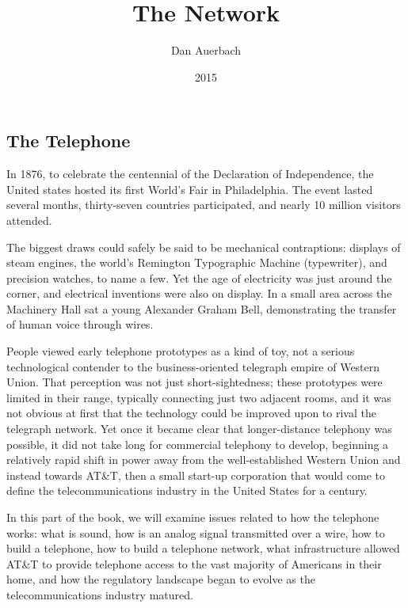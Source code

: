 \documentclass[UTF8]{book}
\begin{document}
\begin{CJK}{UTF8}{gbsn}

\title{The Network}
\author{Dan Auerbach}
\date{2015}
\maketitle

\part{The Telephone}

In 1876, to celebrate the centennial of the Declaration of Independence, the United states hosted its first World's Fair in Philadelphia. The event lasted several months, thirty-seven countries participated, and nearly 10 million visitors attended.

The biggest draws could safely be said to be mechanical contraptions: displays of steam engines, the world's Remington Typographic Machine (typewriter), and precision watches, to name a few. Yet the age of electricity was just around the corner, and electrical inventions were also on display. In a small area across the Machinery Hall sat a young Alexander Graham Bell, demonstrating the transfer of human voice through wires.

People viewed early telephone prototypes as a kind of toy, not a serious technological contender to the business-oriented telegraph empire of Western Union. That perception was not just short-sightedness; these prototypes were limited in their range, typically connecting just two adjacent rooms, and it was not obvious at first that the technology could be improved upon to rival the telegraph network. Yet once it became clear that longer-distance telephony was possible, it did not take long for commercial telephony to develop, beginning a relatively rapid shift in power away from the well-established Western Union and instead towards AT\&T, then a small start-up corporation that would come to define the telecommunications industry in the United States for a century.

In this part of the book, we will examine issues related to how the telephone works: what is sound, how is an analog signal transmitted over a wire, how to build a telephone, how to build a telephone network, what infrastructure allowed AT\&T to provide telephone access to the vast majority of Americans in their home, and how the regulatory landscape began to evolve as the telecommunications industry matured.


\end{CJK}
\end{document}
